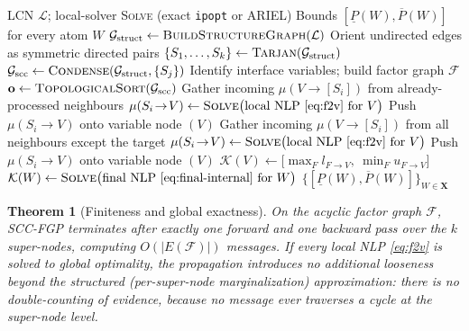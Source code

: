 \documentclass[11pt]{article}
\newtheorem{theorem}{Theorem}
\newcommand{\cK}{\mathcal{K}}
\newcommand{\cL}{\mathcal{L}}
\newcommand{\cG}{\mathcal{G}}
\newcommand{\cF}{\mathcal{F}}
\newcommand{\bX}{\mathbf{X}}
\newcommand{\scc}{\mathrm{scc}}
\newcommand{\lo}{\underline}
\newcommand{\hi}{\overline}
\newcommand{\Vars}{\mathrm{Vars}}
\begin{document}
\begin{algorithm}[H]
\caption{SCC Factor-Graph Propagation (SCC-FGP)}
\label{alg:sccfgp}
\begin{algorithmic}[1]
\Require LCN $\cL$; local-solver \textsc{Solve} (exact \texttt{ipopt} or ARIEL)
\Ensure Bounds $[\lo P(W),\hi P(W)]$ for every atom $W$
\Statex
{}
\State $\cG_{\text{struct}} \gets \textsc{BuildStructureGraph}(\cL)$
\State Orient undirected edges as symmetric directed pairs
\State $\{S_1,\dots,S_k\} \gets \textsc{Tarjan}(\cG_{\text{struct}})$
\State $\cG_{\scc} \gets \textsc{Condense}(\cG_{\text{struct}},\{S_j\})$
\State Identify interface variables; build factor graph $\cF$
\State $\mathbf{o} \gets \textsc{TopologicalSort}(\cG_{\scc})$
\Statex
{}
  \State Gather incoming $\mu(V\!\to\![S_i])$ from already-processed
         neighbours 
     \State $\mu(S_i\!\to\!V) \gets \textsc{Solve}\bigl(\text{local NLP
            \eqref{eq:f2v} for } V\bigr)$
     \State Push $\mu(S_i\!\to\!V)$ onto variable node $(V)$
  \EndFor
\EndFor
\Statex
{}
  \State Gather incoming $\mu(V\!\to\![S_i])$ from all neighbours
         except the target 
     \State $\mu(S_i\!\to\!V) \gets \textsc{Solve}\bigl(\text{local NLP
            \eqref{eq:f2v} for } V\bigr)$
     \State Push $\mu(S_i\!\to\!V)$ onto variable node $(V)$
  \EndFor
\EndFor
\Statex
{}
  \State $\cK(V)\gets\bigl[\max_F l_{F\to V},\ \min_F u_{F\to V}\bigr]$
\EndFor
{}
  \For{each internal atom $W\in\Vars(S_j)$}
     \State $\cK(W)\gets\textsc{Solve}\bigl(\text{final NLP
            \eqref{eq:final-internal} for }W\bigr)$
  \EndFor
\EndFor
\State \Return $\{[\lo P(W),\hi P(W)]\}_{W\in\bX}$
\end{algorithmic}
\end{algorithm}

\begin{theorem}[Finiteness and global exactness]
On the acyclic factor graph $\cF$, SCC-FGP terminates after exactly one
forward and one backward pass over the $k$ super-nodes, computing
$O(|E(\cF)|)$ messages. If every local NLP \eqref{eq:f2v} is solved to global
optimality, the propagation introduces \emph{no} additional looseness beyond
the structured (per-super-node marginalization) approximation: there is no
double-counting of evidence, because no message ever traverses a cycle at the
super-node level.
\end{theorem}
\end{document}
